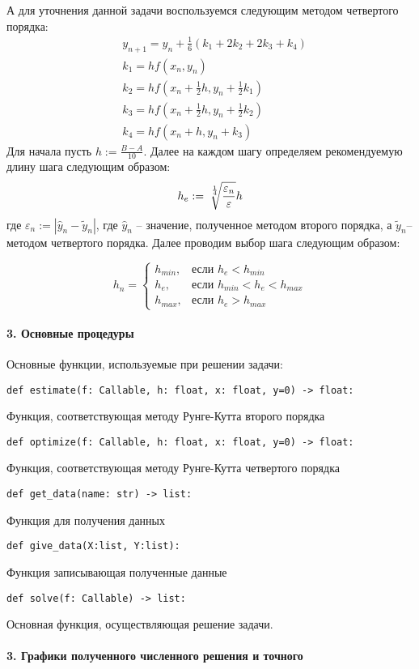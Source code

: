 \documentclass[11pt,a4paper]{report}
\begin{document}
А для уточнения данной задачи воспользуемся следующим методом четвертого порядка:
\[
	\begin{aligned}
		 & y_{n+1} = y_n + \frac{1}{6}(k_1 + 2k_2 + 2k_3 + k_4) \\
		 & k_1 = hf(x_n,y_n)                                    \\
		 & k_2 = hf(x_n + \frac{1}{2}h, y_n + \frac{1}{2}k_1)   \\
		 & k_3 = hf(x_n + \frac{1}{2}h, y_n + \frac{1}{2}k_2)   \\
		 & k_4 = hf(x_n + h, y_n + k_3)
	\end{aligned}
\]
Для начала пусть $ h := \frac{B - A}{10} $. Далее на каждом шагу определяем рекомендуемую длину шага следующим образом:
\[
	h_e := \sqrt[\leftroot{-2}\uproot{5}\frac{1}{4}]{\frac{\varepsilon_n}{\varepsilon}}h
\]
где $ \varepsilon_n := |\hat{y}_n - \tilde{y}_n | $, где $\hat{y}_n$ -- значение, полученное методом второго порядка, а $\tilde{y}_n$-- методом четвертого порядка. Далее проводим выбор шага следующим образом:

\[
	h_n = \begin{cases}
		h_{min}, & \text{если $h_e < h_{min}$}           \\
		h_e,     & \text{если $h_{min} < h_e < h_{max}$} \\
		h_{max}, & \text{если $h_e > h_{max}$}
	\end{cases}
\]

\paragraph{3. Основные процедуры}
Основные функции, используемые при решении задачи:


\begin{lstlisting}
def estimate(f: Callable, h: float, x: float, y=0) -> float:
\end{lstlisting}
Функция, соответствующая методу Рунге-Кутта второго порядка
\begin{lstlisting}
def optimize(f: Callable, h: float, x: float, y=0) -> float:
\end{lstlisting}
Функция, соответствующая методу Рунге-Кутта четвертого порядка
\begin{lstlisting}
def get_data(name: str) -> list:
\end{lstlisting}
Функция для получения данных
\begin{lstlisting}
def give_data(X:list, Y:list):
\end{lstlisting}
Функция записывающая полученные данные
\begin{lstlisting}
def solve(f: Callable) -> list:
\end{lstlisting}
Основная функция, осуществляющая решение задачи.
\paragraph{3. Графики полученного численного решения и точного}
\end{document}
